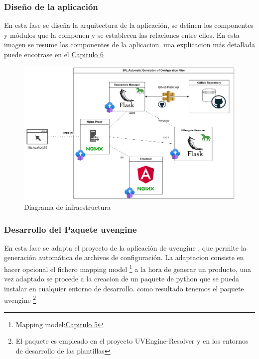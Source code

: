 \documentclass[12pt, a4paper, twoside]{article}
\begin{document}
\newpage 
\subsubsection{Diseño de la aplicación}
En esta fase se diseña la arquitectura de la aplicación, se definen los componentes y módulos que la componen y se establecen las relaciones entre ellos. 
En esta imagen se resume los componentes de la aplicacion. una explicacion más detallada puede encotrase en el \hyperref[sec:Arquitectura y Descripción del sistema]{Capitulo 6}
\begin{figure}[h]
	\centering
		\includegraphics[width=1\textwidth]{Arquitectura Contenedores.png}
	\caption{Diagrama de infraestructura } 
\end{figure}
\subsubsection{Desarrollo del Paquete uvengine }
En esta fase se adapta el proyecto de la aplicación de uvengine \cite{uvengine_github}, que permite la generación automática de archivos de configuración.
La adaptacion consiste en hacer opcional el fichero mapping model \footnote{Mapping model:\hyperref[sec:Mapping Model]{Capitulo 5}} a la hora de generar un producto, una vez adaptado se procede a la creacion de un paquete de python que se pueda instalar en cualquier entorno de desarrollo.
como resultado tenemos el paquete uvengine \cite{uvengine_pypi} \footnote{El paquete es empleado en el proyecto UVEngine-Resolver y en los entornos de desarrollo de las plantillas}
\end{document}
